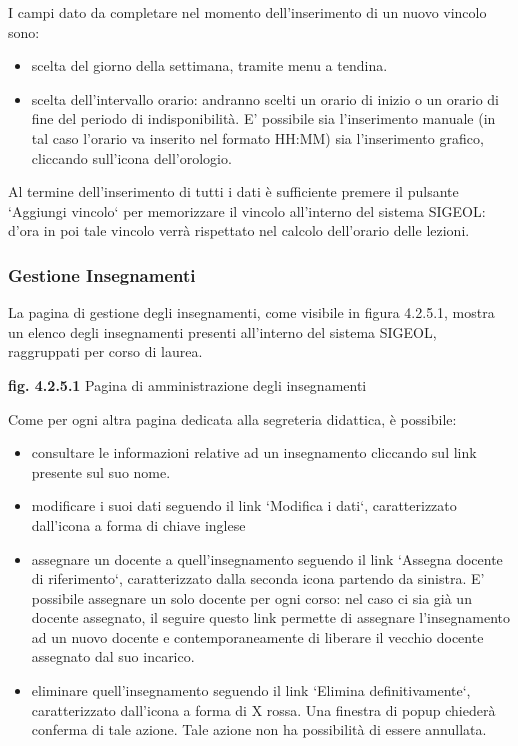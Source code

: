 \documentclass[11pt,a4paper]{article}
\begin{document}
I campi dato da completare nel momento dell'inserimento di un nuovo vincolo sono:
\begin{itemize}
 \item scelta del giorno della settimana, tramite menu a tendina.
 \item scelta dell'intervallo orario: andranno scelti un orario di inizio o un orario di fine del periodo di indisponibilità. E' possibile sia l'inserimento manuale (in tal caso l'orario va inserito nel formato HH:MM) sia l'inserimento grafico, cliccando sull'icona dell'orologio.
\end{itemize}
Al termine dell'inserimento di tutti i dati è sufficiente premere il pulsante `Aggiungi vincolo` per memorizzare il vincolo all'interno del sistema SIGEOL: d'ora in poi tale vincolo verrà rispettato nel calcolo dell'orario delle lezioni.
\subsubsection{Gestione Insegnamenti}
La pagina di gestione degli insegnamenti, come visibile in figura 4.2.5.1, mostra un elenco degli insegnamenti presenti all'interno del sistema SIGEOL, raggruppati per corso di laurea.

\bigskip
\begin{center}
	\textbf{fig. 4.2.5.1} Pagina di amministrazione degli insegnamenti\\
\end{center}
\bigskip

Come per ogni altra pagina dedicata alla segreteria didattica, è possibile:
\begin{itemize}
 \item consultare le informazioni relative ad un insegnamento cliccando sul link presente sul suo nome.
 \item modificare i suoi dati seguendo il link `Modifica i dati`, caratterizzato dall'icona a forma di chiave inglese
 \item assegnare un docente a quell'insegnamento seguendo il link `Assegna docente di riferimento`, caratterizzato dalla seconda icona partendo da sinistra. E' possibile assegnare un solo docente per ogni corso: nel caso ci sia già un docente assegnato, il seguire questo link permette di assegnare l'insegnamento ad un nuovo docente e contemporaneamente di liberare il vecchio docente assegnato dal suo incarico.
 \item eliminare quell'insegnamento seguendo il link `Elimina definitivamente`, caratterizzato dall'icona a forma di X rossa. Una finestra di popup chiederà conferma di tale azione. Tale azione non ha possibilità di essere annullata.
\end{itemize}
\end{document}

